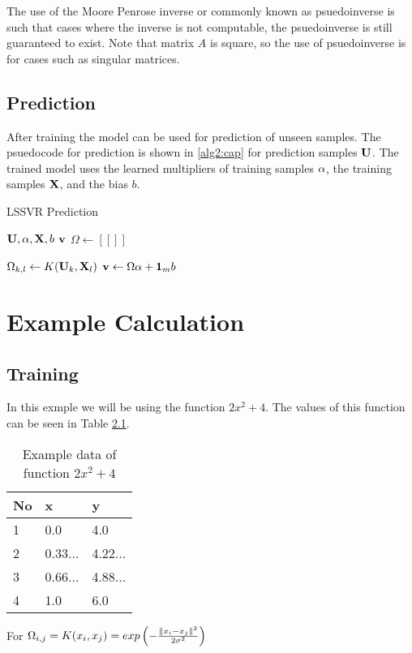 \documentclass[a4paper,12pt]{scrreprt}
\begin{document}
The use of the Moore Penrose inverse or commonly known as psuedoinverse is such that cases where the inverse is not computable, the psuedoinverse is still guaranteed to exist. Note that matrix $A$ is square, so the use of psuedoinverse is for cases such as singular matrices.

\section{Prediction}
After training the model can be used for prediction of unseen samples. The psuedocode for prediction is shown in \cref{alg2:cap} for prediction samples $\vb{U}$. The trained model uses the learned multipliers of training samples $\vb{\alpha}$, the training samples $\vb{X}$, and the bias $b$.

\begin{algorithm}[H]
        \caption{LSSVR Prediction}\label{alg2:cap}
        \begin{algorithmic}[1]
                \Require $\vb{U}, \vb{\alpha}, \vb{X}, b$
                \Ensure $\vb{v}$
                \State $\Omega \gets [[]]$ 

                \State$\Omega_{k,l}\gets K(\vb{U}_{k},\vb{X}_l)$
                \EndFor
                \EndFor
                \State $\vb{v} \gets \Omega\vb{\alpha} + \vb{1}_{m}b$
        \end{algorithmic}
\end{algorithm}

\chapter{Example Calculation}
\section{Training}
In this exmple we will be using the function $2x^2+4$. The values of this function can be seen in Table \ref{table:1}.

\begin{table}[H]
        \centering
        \begin{tabular}{@{}lll@{}}
                \toprule
                No & x       & y       \\ \midrule
                1  & 0.0     & 4.0     \\
                2  & 0.33... & 4.22... \\
                3  & 0.66... & 4.88... \\
                4  & 1.0     & 6.0     \\
                \bottomrule
        \end{tabular}
        \caption{Example data of function $2x^2+4$} \label{table:1}
\end{table}
For $\Omega_{i,j}=K(x_i,x_j)=exp \left(-\frac{\norm*{x_i-x_j}^2}{2\sigma^2}\right)$
\end{document}
